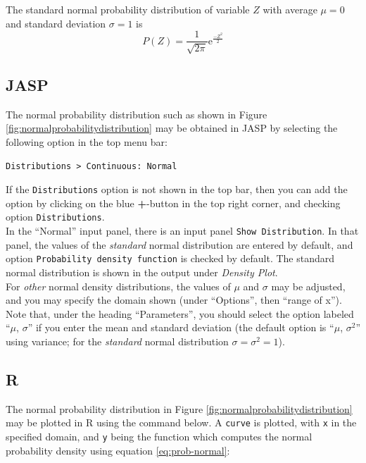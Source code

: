 \documentclass[
]{book}
\begin{document}
The standard normal probability distribution of variable \(Z\) with average
\(\mu=0\) and standard deviation \(\sigma=1\) is
\begin{equation}
    P(Z) = \frac{1}{\sqrt{2\pi}} \mbox{e}^{ \frac{-Z^2}{2} }
  \label{eq:prob-standardnormal}
\end{equation}

\subsection{JASP}\label{jasp-5}

The normal probability distribution such as shown in Figure \ref{fig:normalprobabilitydistribution} may be obtained in JASP by selecting the following option in the top menu bar:

\begin{verbatim}
Distributions > Continuous: Normal
\end{verbatim}

If the \texttt{Distributions} option is not shown in the top bar, then you can add the option by clicking on the blue \textbf{+}-button in the top right corner, and checking option \texttt{Distributions}.\\
In the ``Normal'' input panel, there is an input panel \texttt{Show\ Distribution}. In that panel, the values of the \emph{standard} normal distribution are entered by default, and option \texttt{Probability\ density\ function} is checked by default. The standard normal distribution is shown in the output under \emph{Density Plot}.\\
For \emph{other} normal density distributions, the values of \(\mu\) and \(\sigma\) may be adjusted, and you may specify the domain shown (under ``Options'', then ``range of x'').
Note that, under the heading ``Parameters'', you should select the option labeled ``\(\mu\), \(\sigma\)'' if you enter the mean and standard deviation (the default option is ``\(\mu\), \(\sigma^2\)'' using variance; for the \emph{standard} normal distribution \(\sigma=\sigma^2=1\)).

\subsection{R}\label{r-5}

The normal probability distribution in Figure \ref{fig:normalprobabilitydistribution} may be plotted in R using the command below. A \texttt{curve} is plotted, with \texttt{x} in the specified domain, and \texttt{y} being the function which computes the normal probability density using equation \eqref{eq:prob-normal}:
\end{document}
